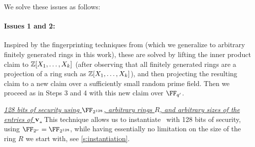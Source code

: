 \bigskip



\noindent We solve these issues as follows: 


\paragraph{Issues 1 and 2:} Inspired by the fingerprinting techniques from \cite{zaratan,zincplus} (which we generalize to arbitrary finitely generated rings in this work), these are solved by lifting the inner product claim to $\mathbb{Z}[X_1, \ldots, X_k]$ (after observing that all finitely generated rings are a projection of a ring such as $\mathbb{Z}[X_1, \ldots, X_k]$), and then projecting the resulting claim to a new claim over a sufficiently small random prime field. Then we proceed as in Steps 3 and 4 with this new claim over $\FF_{q'}$.  %

\iflncs
\else \fi

\iflncs \else
\bigskip
 
\noindent \emph{\underline{128 bits of security using $\FF_{2^{128}}$, arbitrary rings $R$, and arbitrary sizes of the entries of $\mathbf{v}$.}} %
This technique allows us  to instantiate \ftwoz\ with 128 bits of security, using $\comfield=\FF_{2^{128}}$, while having essentially no limitation on the size of the ring $R$ we start with, see \cref{s:instantiation}.
\fi


